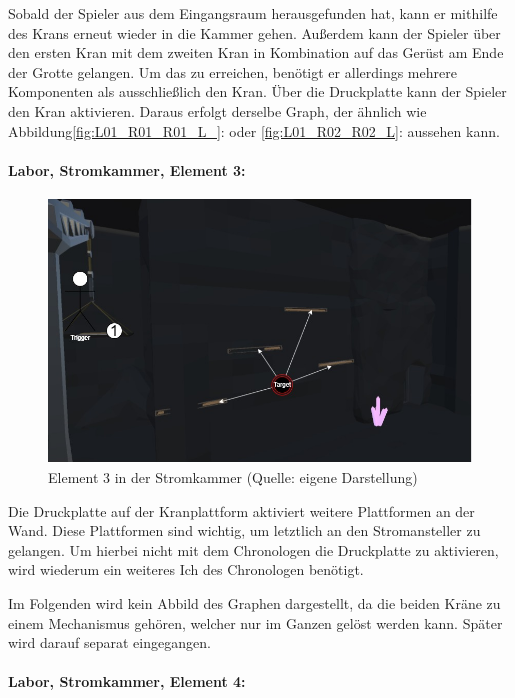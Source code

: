 Sobald der Spieler aus dem Eingangsraum herausgefunden hat, kann er mithilfe des Krans erneut wieder in die Kammer gehen. Außerdem kann der Spieler über den ersten Kran mit dem zweiten Kran in Kombination auf das Gerüst am Ende der Grotte gelangen. Um das zu erreichen, benötigt er allerdings mehrere Komponenten als ausschließlich den Kran. Über die Druckplatte kann der Spieler den Kran aktivieren. Daraus erfolgt derselbe Graph, der ähnlich wie Abbildung\ref{fig:L01_R01_R01_L_}:  oder \ref{fig:L01_R02_R02_L}:  aussehen kann.

\paragraph{Labor, Stromkammer, Element 3:}\label{p:lse3}

\begin{figure}[ht]
\centering
\includegraphics[width=0.8\linewidth]{content/pictures/Raetsel-L02_R01_R03.jpg}
\caption{Element 3 in der Stromkammer (Quelle: eigene Darstellung)}
\label{fig:L02_R01_R03}
\end{figure}

Die Druckplatte auf der Kranplattform aktiviert weitere Plattformen an der Wand. Diese Plattformen sind wichtig, um letztlich an den Stromansteller zu gelangen. Um hierbei nicht mit dem Chronologen die Druckplatte zu aktivieren, wird wiederum ein weiteres Ich des Chronologen benötigt. 

Im Folgenden wird kein Abbild des Graphen dargestellt, da die beiden Kräne zu einem Mechanismus gehören, welcher nur im Ganzen gelöst werden kann. Später wird darauf separat eingegangen.

\paragraph{Labor, Stromkammer, Element 4:}\label{p:lse4}

